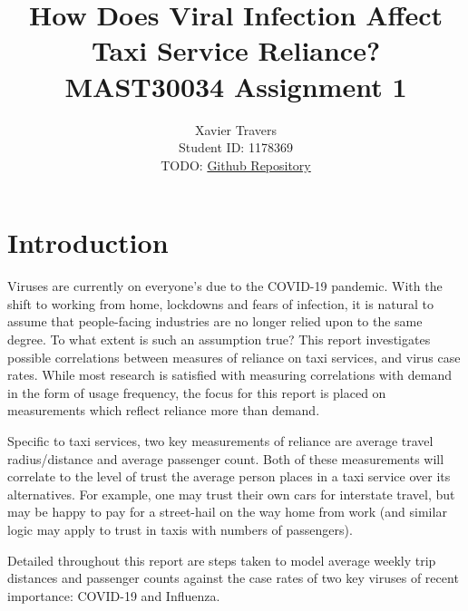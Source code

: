 \documentclass[11pt]{article}
\title{\textbf{How Does Viral Infection Affect Taxi Service Reliance?} \\ 
MAST30034 Assignment 1}
\author{
Xavier Travers \\
Student ID: 1178369 \\
TODO: \href{https://github.com/MAST30034-Applied-Data-Science/mast30034\_p1\_template/tree/fd9f1dd17fdbcb5b119b70c93a22da8210d44fd7}{Github Repository}
}
\begin{document}
\maketitle

\section{Introduction}

Viruses are currently on everyone's due to the COVID-19 pandemic.
With the shift to working from home, lockdowns and fears of infection, 
it is natural to assume that people-facing industries are no longer relied upon to the same degree.
To what extent is such an assumption true?
This report investigates possible correlations between measures of reliance on taxi services, and virus case rates.
While most research is satisfied with measuring correlations with demand in the form of usage frequency, 
the focus for this report is placed on measurements which reflect reliance more than demand.

Specific to taxi services, two key measurements of reliance are average travel radius/distance and average passenger count.
Both of these measurements will correlate to the level of trust the average person places in a taxi service over its alternatives.
For example, one may trust their own cars for interstate travel, 
but may be happy to pay for a street-hail on the way home from work (and similar logic may apply to trust in taxis with numbers of passengers).

Detailed throughout this report are steps taken to model average weekly trip distances and passenger counts against
the case rates of two key viruses of recent importance: COVID-19 and Influenza.
\end{document}
